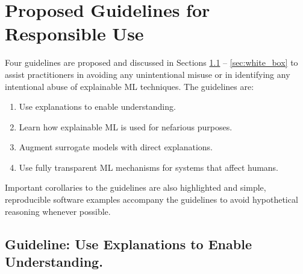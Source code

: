 \documentclass{article}
\begin{document}
\section{Proposed Guidelines for Responsible Use}

Four guidelines are proposed and discussed in Sections \ref{sec:trust} -- \ref{sec:white_box} to assist practitioners in avoiding any unintentional misuse or in identifying any intentional abuse of explainable ML techniques. The guidelines are: 

\begin{enumerate}

\item Use explanations to enable understanding.
\item Learn how explainable ML is used for nefarious purposes.
\item Augment surrogate models with direct explanations.
\item Use fully transparent ML mechanisms for systems that affect humans.

\end{enumerate}

\noindent Important corollaries to the guidelines are also highlighted and simple, reproducible software examples accompany the guidelines to avoid hypothetical reasoning whenever possible. 

\subsection{Guideline: Use Explanations to Enable Understanding.} \label{sec:trust}
\end{document}
